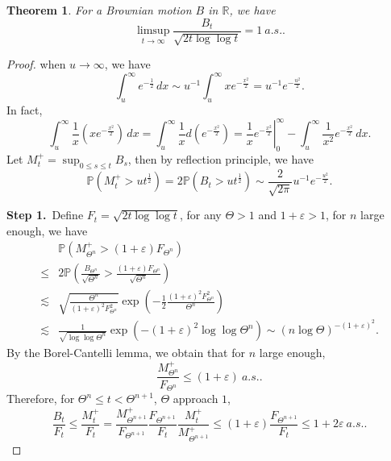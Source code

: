 \documentclass[11pt]{article}
\newtheorem{theorem}{Theorem}[section]
\theoremstyle{definition}
\begin{document}
\begin{theorem}
  For a Brownian motion $B$ in $\mathbb{R}$, we have
\[
\limsup_{t\rightarrow \infty}\frac{B_t}{\sqrt{2t\log\log t}}=1\ a.s..
\]
\end{theorem}
\begin{proof}
when $u\rightarrow \infty$, we have
\[
\int_u^{\infty} e^{-\frac{1}{2}}\,dx\sim u^{-1}\int^\infty_u x e^{-\frac{x^2}{2}}=u^{-1}e^{-\frac{u^2}{2}}.
\]
In fact,
\[
\int_u^\infty \frac{1}{x} (xe^{-\frac{x^2}{2}})\,dx=\int^\infty_u \frac{1}{x}d(e^{-\frac{x^2}{2}})=\left.\frac{1}{x} e^{-\frac{x^2}{2}}\right|^\infty_0-\int^\infty_u \frac{1}{x^2} e^{-\frac{x^2}{2}}\,dx.
\]
Let $M^+_t=\sup_{0\le s\le t} B_s$, then by reflection principle, we have 
\[
\mathbb{P}(M_t^+> ut^\frac{1}{2})=2\mathbb{P}(B_t>u t^\frac{1}{2})\sim \frac{2}{\sqrt{2\pi}} u^{-1} e^{-\frac{u^2}{2}}.
\]

{\bf Step 1.}\ Define $F_t=\sqrt{2t\log\log t}$, for any $\Theta>1$ and $1+\varepsilon>1$, for $n$ large enough, we have
\begin{equation*}
  \begin{aligned}
   &\mathbb{P}(M^+_{\Theta^n}> (1+\varepsilon)F_{\Theta^{n}}) \\
\le& 2\mathbb{P}\left(\frac{B_{\Theta^n}}{\sqrt{\Theta^{n}}}> \frac{(1+\varepsilon) F_{\Theta^{n}}}{\sqrt{\Theta^n}} \right)\\ 
\lesssim& \sqrt{\frac{\Theta^n}{(1+\varepsilon)^2F^2_{\Theta^{n}}}}\exp\left( -\frac{1}{2} \frac{(1+\varepsilon)^2 F^2_{\Theta^{n}}}{\Theta^n} \right)\\ 
\lesssim& \frac{1}{\sqrt{\log \log \Theta^n}} \exp\left( -(1+\varepsilon)^2\log\log \Theta^n \right)\sim(n\log \Theta)^{-(1+\varepsilon)^2}.
  \end{aligned}
\end{equation*}
By the Borel-Cantelli lemma, we obtain that for $n$ large enough,
\[
\frac{M^+_{\Theta^n}}{F_{\Theta^n}}\le (1+\varepsilon)\ a.s..
\]
Therefore, for $\Theta^n\le t<\Theta^{n+1}$, $\Theta$ approach $1$,
\[
\frac{B_t}{F_t}\le \frac{M^+_{t}}{F_t}=\frac{M^+_{\Theta^{n+1}}}{F_{\Theta^{n+1}}}\frac{F_{\Theta^{n+1}}}{F_{t}}\frac{M^+_t}{M^+_{\Theta^{n+1}}}\le (1+\varepsilon)\frac{F_{\Theta^{n+1}}}{F_{t}} \le 1+2\varepsilon\ a.s..
\]





\end{proof}
\end{document}
